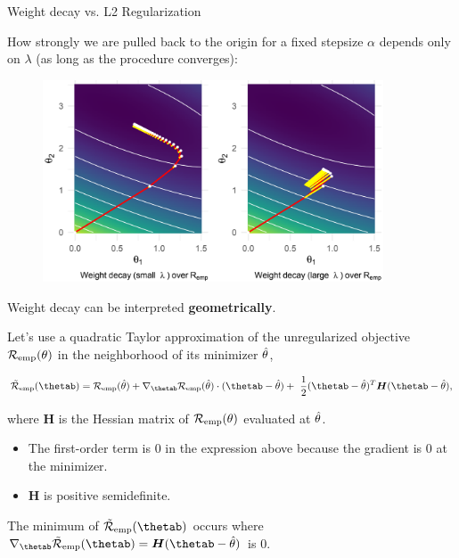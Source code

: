 \begin{vbframe}{Weight decay vs. L2 Regularization}
\framebreak

How strongly we are pulled back to the origin for a fixed stepsize $\alpha$ depends only on $\lambda$ (as long as the procedure converges):

\begin{figure}
\includegraphics[width=0.9\textwidth]{figure_man/L2-regularization02.png}\\
\end{figure}


\framebreak

Weight decay can be interpreted \textbf{geometrically}. 

\lz 

Let's use a quadratic Taylor approximation of the unregularized objective $\mathcal{R}_{\text{emp}}(\theta)$ in the neighborhood of its minimizer $\hat{\theta}$,  

$$ \mathcal{\tilde R}_{\text{emp}}(\thetab)= \mathcal{R}_{\text{emp}}(\thetah) + \nabla_{\thetab} \mathcal{R}_{\text{emp}}(\thetah)\cdot(\thetab - \thetah) + \ \frac{1}{2} (\thetab - \thetah)^T \bm{H} (\thetab - \thetah), $$

where $\bm{H}$ is the Hessian matrix of $\mathcal{R}_{\text{emp}}(\theta)$ evaluated at $\hat{\theta}$. 

\lz

\begin{itemize}
  \item The first-order term is 0 in the expression above because the gradient is $0$ at the minimizer.
  \item $\bm{H}$ is positive semidefinite.
\end{itemize}

\lz

\framebreak

\normalsize

The minimum of $\mathcal{\tilde R}_{\text{emp}}(\thetab)$ occurs where $\nabla_{\thetab}\mathcal{\tilde R}_{\text{emp}}(\thetab) = \bm{H}(\thetab - \thetah)$ is $0$.


\end{vbframe}

